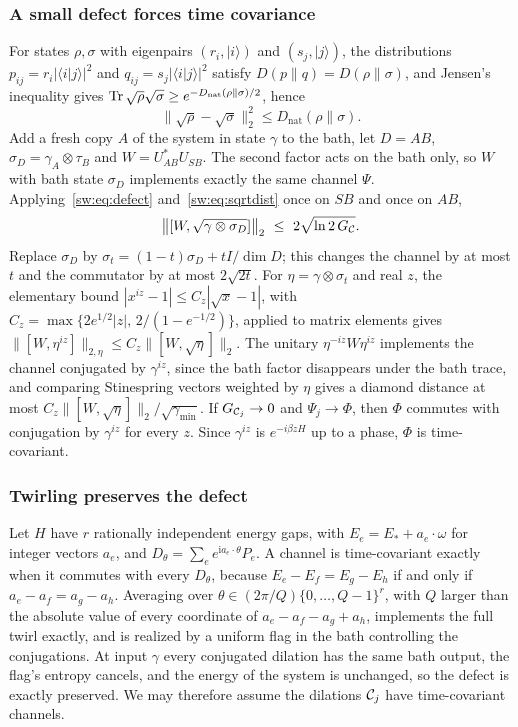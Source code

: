 \subsubsection{A small defect forces time covariance}

For states $\rho,\sigma$ with eigenpairs $(r_i,|i\rangle)$ and $(s_j,|j\rangle)$, the distributions $p_{ij}=r_i|\langle i|j\rangle|^2$ and $q_{ij}=s_j|\langle i|j\rangle|^2$ satisfy $D(p\|q)=D(\rho\|\sigma)$, and Jensen's inequality gives $\operatorname{Tr}\sqrt\rho\sqrt\sigma\ge e^{-D_{\mathrm{nat}}(\rho\|\sigma)/2}$, hence
\begin{equation}\label{sw:eq:sqrtdist}
\|\sqrt\rho-\sqrt\sigma\|_2^2\le D_{\mathrm{nat}}(\rho\|\sigma).
\end{equation}
Add a fresh copy $A$ of the system in state $\gamma$ to the bath, let $D=AB$, $\sigma_D=\gamma_A\otimes\tau_B$ and $W=U_{AB}^*U_{SB}$. The second factor acts on the bath only, so $W$ with bath state $\sigma_D$ implements exactly the same channel $\Psi$. Applying~\eqref{sw:eq:defect} and~\eqref{sw:eq:sqrtdist} once on $SB$ and once on $AB$,
\begin{equation}\label{sw:eq:commutator}
\bigl\|[W,\sqrt{\gamma\otimes\sigma_D}]\bigr\|_2\ \le\ 2\sqrt{\ln2\,G_{\Dil}}.
\end{equation}
Replace $\sigma_D$ by $\sigma_t=(1-t)\sigma_D+tI/\dim D$; this changes the channel by at most $t$ and the commutator by at most $2\sqrt{2t}$. For $\eta=\gamma\otimes\sigma_t$ and real $z$, the elementary bound $|x^{iz}-1|\le C_z|\sqrt x-1|$, with $C_z=\max\{2e^{1/2}|z|,\,2/(1-e^{-1/2})\}$, applied to matrix elements gives $\|[W,\eta^{iz}]\|_{2,\eta}\le C_z\|[W,\sqrt\eta]\|_2$. The unitary $\eta^{-iz}W\eta^{iz}$ implements the channel conjugated by $\gamma^{iz}$, since the bath factor disappears under the bath trace, and comparing Stinespring vectors weighted by $\eta$ gives a diamond distance at most $C_z\|[W,\sqrt\eta]\|_2/\sqrt{\gamma_{\min}}$. If $G_{\mathcal C_j}\to0$ and $\Psi_j\to\Phi$, then $\Phi$ commutes with conjugation by $\gamma^{iz}$ for every $z$. Since $\gamma^{iz}$ is $e^{-i\beta zH}$ up to a phase, $\Phi$ is time-covariant.

\subsubsection{Twirling preserves the defect}

Let $H$ have $r$ rationally independent energy gaps, with $E_e=E_*+a_e\cdot\omega$ for integer vectors $a_e$, and $D_\theta=\sum_ee^{\mathrm ia_e\cdot\theta}P_e$. A channel is time-covariant exactly when it commutes with every $D_\theta$, because $E_e-E_f=E_g-E_h$ if and only if $a_e-a_f=a_g-a_h$. Averaging over $\theta\in(2\pi/Q)\{0,\dots,Q-1\}^r$, with $Q$ larger than the absolute value of every coordinate of $a_e-a_f-a_g+a_h$, implements the full twirl exactly, and is realized by a uniform flag in the bath controlling the conjugations. At input $\gamma$ every conjugated dilation has the same bath output, the flag's entropy cancels, and the energy of the system is unchanged, so the defect is exactly preserved. We may therefore assume the dilations $\mathcal C_j$ have time-covariant channels.

